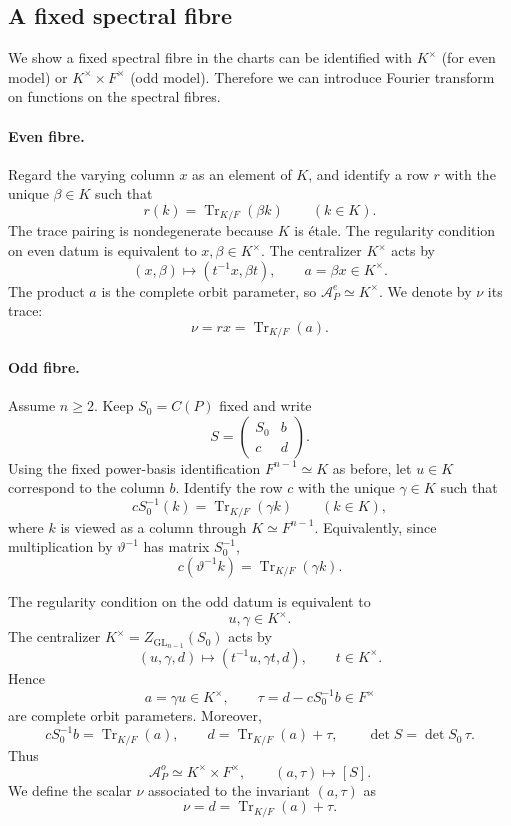 \documentclass[11pt,oneside,notitlepage]{book}
\numberwithin{equation}{section}
\theoremstyle{plain}
\theoremstyle{definition}
\newcommand{\GL}{\mathrm{GL}}
\newcommand{\Tr}{\operatorname{Tr}}
\begin{document}
\subsection*{A fixed spectral fibre}
\label{par:fibre-coordinates}
We show a fixed spectral fibre in the charts can be identified with $K^\times$ (for even model) or $K^\times\times F^\times$ (odd model). Therefore we can introduce Fourier transform on functions on the spectral fibres.

\paragraph{Even fibre.} Regard the varying column $x$ as an element of $K$, and identify a row $r$ with the unique $\beta\in K$ such that
\[
 r(k)=\Tr_{K/F}(\beta k)\qquad(k\in K).
\]
The trace pairing is nondegenerate because $K$ is \'etale. The regularity condition on even datum is equivalent to $x,\beta\in K^\times$. The centralizer $K^\times$ acts by
\[
 (x,\beta)\longmapsto(t^{-1}x,\beta t),
 \qquad a=\beta x\in K^\times.
\]
The product $a$ is the complete orbit parameter, so $\mathcal A_P^e\simeq K^\times$. We denote by $\nu$ its trace:
\[
 \nu=rx=\Tr_{K/F}(a).
\]
\paragraph{Odd fibre.}
Assume $n\ge2$. Keep $S_0=C(P)$ fixed and write
\[
S=\begin{pmatrix}S_0&b\\ c&d\end{pmatrix}.
\]
Using the fixed power-basis identification $F^{n-1}\simeq K$ as before, let $u\in K$ correspond to the column $b$. Identify the row $c$ with the unique $\gamma\in K$ such that
\[
cS_0^{-1}(k)=\Tr_{K/F}(\gamma k)
\qquad(k\in K),
\]
where $k$ is viewed as a column through $K\simeq F^{n-1}$. Equivalently, since multiplication by $\vartheta^{-1}$ has matrix $S_0^{-1}$,
\[
c(\vartheta^{-1}k)=\Tr_{K/F}(\gamma k).
\]

The regularity condition on the odd datum is equivalent to
\[
u,\gamma\in K^\times.
\]
The centralizer $K^\times=Z_{\GL_{n-1}}(S_0)$ acts by
\[
(u,\gamma,d)\longmapsto(t^{-1}u,\gamma t,d),
\qquad t\in K^\times.
\]
Hence
\[
a=\gamma u\in K^\times,
\qquad
\tau=d-cS_0^{-1}b\in F^\times
\]
are complete orbit parameters. Moreover,
\[
cS_0^{-1}b=\Tr_{K/F}(a),
\qquad
d=\Tr_{K/F}(a)+\tau,
\qquad
\det S=\det S_0\,\tau.
\]
Thus
\[
\mathcal A_P^o\simeq K^\times\times F^\times,
\qquad
(a,\tau)\longmapsto [S].
\]
We define the scalar $\nu$ associated to the invariant $(a,\tau)$ as
\[
\nu=d=\Tr_{K/F}(a)+\tau.
\]
\end{document}
